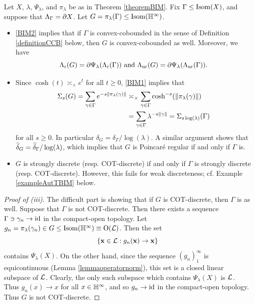 \begin{remark}
\label{remarkBIM}
Let $X$, $\lambda$, $\Psi_\lambda$, and $\pi_\lambda$ be as in Theorem \ref{theoremBIM}. Fix $\Gamma\leq\operatorname{Isom}(X)$, and suppose that $\Lambda_\Gamma = \partial X$. Let $G = \pi_\lambda(\Gamma)\leq\Isom(\H^\infty)$.
\begin{itemize}
\item[(i)] \eqref{BIM2} implies that if $\Gamma$ is convex-cobounded in the sense of Definition \ref{definitionCCB} below, then $G$ is convex-cobounded as well. Moreover, we have 
\begin{equation*}
\Lambda_{\mathrm r}(G) = \partial\Psi_\lambda(\Lambda_{\mathrm r}(\Gamma)) ~\textup{and}~ \Lambda_{\mathrm{ur}}(G) = \partial\Psi_\lambda(\Lambda_{\mathrm{ur}}(\Gamma)).
\end{equation*}
\item[(ii)] Since $\cosh(t) \asymp_\times e^t$ for all $t\geq 0$, \eqref{BIM1} implies that
\begin{align*}
\Sigma_s(G) = \sum_{\gamma\in\Gamma} e^{-s\|\pi_\lambda(\gamma)\|} &\asymp_\times \sum_{\gamma\in\Gamma} \cosh^{-s}(\|\pi_\lambda(\gamma)\|)\\ 
&= \sum_{\gamma\in\Gamma} \lambda^{-s\|\gamma\|} = \Sigma_{s\log(\lambda)}(\Gamma)
\end{align*}
for all $s\geq 0$. In particular $\delta_G = \delta_\Gamma/\log(\lambda)$. A similar argument shows that $\widetilde\delta_G = \widetilde\delta_\Gamma/\log(\lambda)$, which implies that $G$ is Poincar\'e regular if and only if $\Gamma$ is.
\item[(iii)] $G$ is strongly discrete (resp. COT-discrete) if and only if $\Gamma$ is strongly discrete (resp. COT-discrete). However, this fails for weak discreteness; cf. Example \ref{exampleAutTBIM} below.
\end{itemize}
\end{remark}
\begin{proof}[Proof of (iii)]
The difficult part is showing that if $G$ is COT-discrete, then $\Gamma$ is as well. Suppose that $\Gamma$ is not COT-discrete. Then there exists a sequence $\Gamma\ni\gamma_n\to\mathrm{id}$ in the compact-open topology. Let $g_n = \pi_\lambda(\gamma_n)\in G \leq \Isom(\H^\infty) \equiv \O(\LL)$. Then the set
\[
\{\mathbf x\in\mathcal L : g_n(\mathbf x)\to \mathbf x\}
\]
contains $\Psi_\lambda(X)$. On the other hand, since the sequence $(g_n)_1^\infty$ is equicontinuous (Lemma \ref{lemmaoperatornorm}), this set is a closed linear subspace of $\mathcal L$. Clearly, the only such subspace which contains $\Psi_\lambda(X)$ is $\mathcal L$. Thus $g_n(x)\to x$ for all $x\in\H^\infty$, and so $g_n\to\mathrm{id}$ in the compact-open topology. Thus $G$ is not COT-discrete.
\end{proof}

